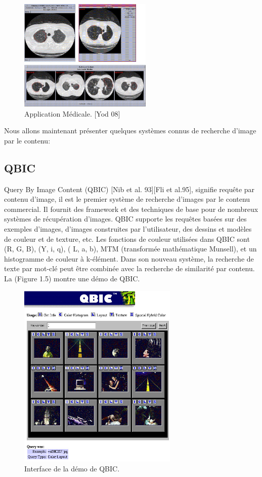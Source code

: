 \begin{figure}[H]
	\centering
		\includegraphics[width=2.5in]{Figures/cbirMedic.jpg}
	\caption[An Electron]{Application Médicale. [Yod 08]}
	\label{fig:Electron}
\end{figure}

	Nous allons maintenant présenter quelques systèmes connus de recherche d'image par le contenu:

\subsection*{QBIC}
	Query By Image Content (QBIC) [Nib et al. 93][Fli et al.95], signifie requête par contenu d'image, il est le premier système de recherche d'images par le contenu commercial. Il fournit des framework et des techniques de base pour de nombreux systèmes de récupération d'images. QBIC supporte les requêtes basées sur des exemples d'images, d'images construites par l'utilisateur, des dessins et modèles de couleur et de texture, etc. Les fonctions de couleur utilisées dans QBIC sont (R, G, B), (Y, i, q), ( L, a, b), MTM (transformée mathématique Munsell), et un histogramme de couleur à k-élément. Dans son nouveau système, la recherche de texte par mot-clé peut être combinée avec la recherche de similarité par contenu. La (Figure 1.5) montre une démo de QBIC.

\begin{figure}[H]
	\centering
		\includegraphics[width=3in]{Figures/qbic-demo.jpg}
	\caption[An Electron]{Interface de la démo de QBIC.}
	\label{fig:Electron}
\end{figure}

